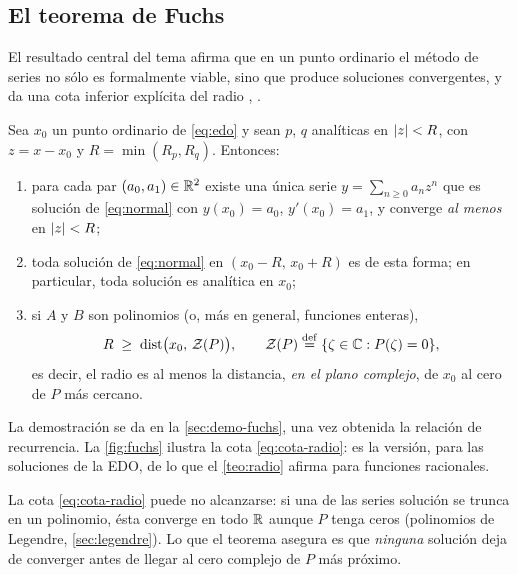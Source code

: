 \subsection{El teorema de Fuchs}\label{sec:fuchs}
El resultado central del tema afirma que en un punto ordinario el método de
series no sólo es formalmente viable, sino que produce soluciones
convergentes, y da una cota inferior explícita del radio
\cite[cap.~16]{RILEY}, \cite[cap.~5]{SIMMONS}.

\begin{teorema}\label{teo:fuchs}
Sea $x_0$ un punto ordinario de \eqref{eq:edo} y sean $p$, $q$ analíticas
en $\lvert z\rvert<R$, con $z=x-x_0$ y $R=\min(R_p,R_q)$. Entonces:
\begin{enumerate}[label=\textup{(\roman*)}]
  \item para cada par $(a_0,a_1)\in\mathbb{R}^{2}$ existe una única serie
        $y=\sum_{n\ge0}a_n z^{n}$ que es solución de \eqref{eq:normal} con
        $y(x_0)=a_0$, $y'(x_0)=a_1$, y converge \emph{al menos} en
        $\lvert z\rvert<R$;
  \item toda solución de \eqref{eq:normal} en $(x_0-R,\,x_0+R)$ es de esta
        forma; en particular, toda solución es analítica en $x_0$;
  \item si $A$ y $B$ son polinomios (o, más en general, funciones enteras),
        \begin{equation}\label{eq:cota-radio}
          R\;\ge\;\operatorname{dist}\bigl(x_0,\,\mathcal Z(P)\bigr),
          \qquad \mathcal Z(P)\mathrel{\overset{\mathrm{def}}{=}}\{\zeta\in\mathbb{C}: P(\zeta)=0\},
        \end{equation}
        es decir, el radio es al menos la distancia, \emph{en el plano
        complejo}, de $x_0$ al cero de $P$ más cercano.
\end{enumerate}
\end{teorema}

La demostración se da en la \cref{sec:demo-fuchs}, una vez obtenida la
relación de recurrencia. La \cref{fig:fuchs} ilustra la cota
\eqref{eq:cota-radio}: es la versión, para las soluciones de la EDO, de lo
que el \cref{teo:radio} afirma para funciones racionales.



\begin{observacion}\label{obs:cota}
La cota \eqref{eq:cota-radio} puede no alcanzarse: si una de las series
solución se trunca en un polinomio, ésta converge en todo $\mathbb{R}$ aunque $P$
tenga ceros (polinomios de Legendre, \cref{sec:legendre}). Lo que el teorema
asegura es que \emph{ninguna} solución deja de converger antes de llegar al
cero complejo de $P$ más próximo.
\end{observacion}

